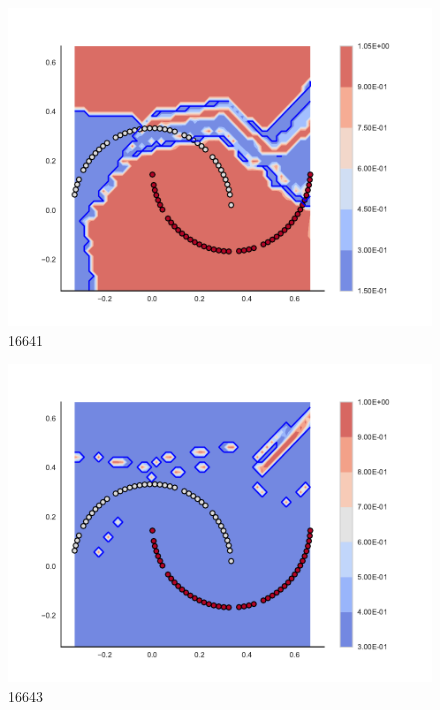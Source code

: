\begin{subfigure}[b]{0.09\textwidth}
    \includegraphics[clip, trim=2.35cm 1.75cm 4.5cm 0cm,width=\textwidth]{img/convergence/16641.pdf}
    \caption{16641}
    \label{fig:convergence_16641}
\end{subfigure}
%
\begin{subfigure}[b]{0.09\textwidth}
    \includegraphics[clip, trim=2.35cm 1.75cm 4.5cm 0cm,width=\textwidth]{img/convergence/16643.pdf}
    \caption{16643}
    \label{fig:convergence_16643}
\end{subfigure}
%
